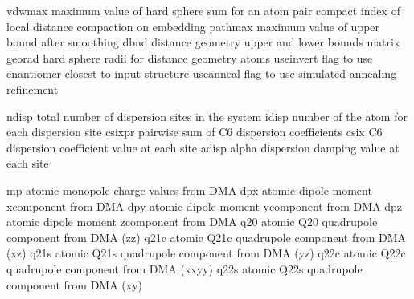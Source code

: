 \documentclass[letterpaper,11pt,english]{sphinxmanual}
\begin{document}

\begin{sphinxVerbatim}[commandchars=\\\{\}]
vdwmax          maximum value of hard sphere sum for an atom pair
compact         index of local distance compaction on embedding
pathmax         maximum value of upper bound after smoothing
dbnd            distance geometry upper and lower bounds matrix
georad          hard sphere radii for distance geometry atoms
use\PYGZus{}invert      flag to use enantiomer closest to input structure
use\PYGZus{}anneal      flag to use simulated annealing refinement
\end{sphinxVerbatim}


\begin{sphinxVerbatim}[commandchars=\\\{\}]
ndisp           total number of dispersion sites in the system
idisp           number of the atom for each dispersion site
csixpr          pairwise sum of C6 dispersion coefficients
csix            C6 dispersion coefficient value at each site
adisp           alpha dispersion damping value at each site
\end{sphinxVerbatim}


\begin{sphinxVerbatim}[commandchars=\\\{\}]
mp              atomic monopole charge values from DMA
dpx             atomic dipole moment x\PYGZhy{}component from DMA
dpy             atomic dipole moment y\PYGZhy{}component from DMA
dpz             atomic dipole moment z\PYGZhy{}component from DMA
q20             atomic Q20 quadrupole component from DMA (zz)
q21c            atomic Q21c quadrupole component from DMA (xz)
q21s            atomic Q21s quadrupole component from DMA (yz)
q22c            atomic Q22c quadrupole component from DMA (xx\PYGZhy{}yy)
q22s            atomic Q22s quadrupole component from DMA (xy)
\end{sphinxVerbatim}

\end{document}
